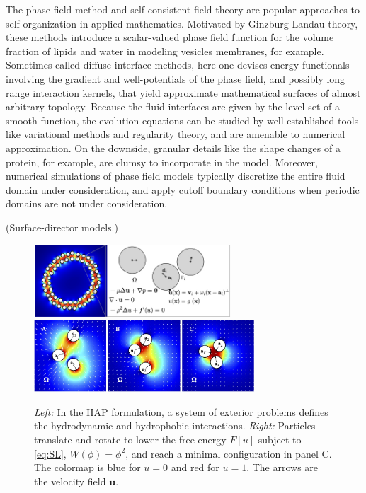The phase field method and self-consistent field theory are popular  
approaches to self-organization in applied mathematics.
Motivated by Ginzburg-Landau theory, these methods introduce a scalar-valued
phase field function for the volume fraction of
lipids and water in modeling vesicles membranes, for example. 
Sometimes called diffuse interface methods, here one devises energy functionals
involving the gradient and well-potentials of the phase field, and possibly
long range interaction kernels, that yield approximate mathematical surfaces
of almost arbitrary topology.
Because the fluid interfaces are given by the level-set
of a smooth function, the evolution equations
can be studied by well-established tools like variational methods
and regularity theory, and are amenable to numerical approximation.
On the downside, granular details like the shape changes of a protein, for
example, are clumsy to incorporate in the model.  Moreover, numerical
simulations of phase field models typically discretize the entire fluid
domain under consideration, and apply cutoff boundary conditions
when periodic domains are not under consideration. 

(Surface-director models.)

\begin{figure}
  \begin{center}
    \includegraphics[keepaspectratio,height=2.7cm]{figures/SpecificAim1/Domain.jpg}
    \includegraphics[keepaspectratio,height=2.7cm]{figures/SpecificAim1/3Particles.jpg}
  \end{center}
  \caption{\label{fig:flow_map} \footnotesize {\em Left:} In the HAP
  formulation, a system of exterior problems defines the hydrodynamic
  and hydrophobic interactions. {\em Right:} Particles translate and
  rotate to lower the free energy $F[u]$ subject to \eqref{eq:SL}, $W(\phi)
  = \phi^2$, and reach a minimal configuration in panel C. The colormap is
  blue for $u = 0$ and red for $u = 1$. The arrows are the velocity
  field $\mathbf{u}$.}
\end{figure}


